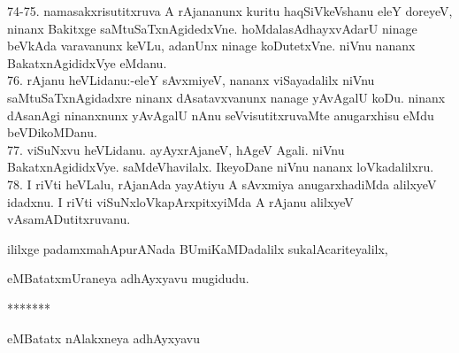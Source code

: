 \documentclass{article}
\begin{document}
74-75. namasakxrisutitxruva A rAjananunx kuritu haqSiVkeVshanu eleY doreyeV, ninanx Bakitxge saMtuSaTxnAgidedxVne. hoMdalasAdhayxvAdarU ninage beVkAda varavanunx keVLu, adanUnx ninage koDutetxVne. niVnu nananx BakatxnAgididxVye eMdanu.\\
76. rAjanu heVLidanu:-eleY sAvxmiyeV, nananx viSayadalilx niVnu saMtuSaTxnAgidadxre ninanx dAsatavxvanunx nanage yAvAgalU koDu. ninanx dAsanAgi ninanxnunx yAvAgalU nAnu seVvisutitxruvaMte anugarxhisu eMdu beVDikoMDanu.\\
77. viSuNxvu heVLidanu. ayAyxrAjaneV, hAgeV Agali. niVnu BakatxnAgididxVye. saMdeVhavilalx. IkeyoDane niVnu nananx loVkadalilxru.\\
78. I riVti heVLalu, rAjanAda yayAtiyu A sAvxmiya anugarxhadiMda alilxyeV idadxnu. I riVti viSuNxloVkapArxpitxyiMda A rAjanu alilxyeV vAsamADutitxruvanu.\\

\begin{center}
ililxge padamxmahApurANada BUmiKaMDadalilx sukalAcariteyalilx,
\end{center}

\begin{center}
eMBatatxmUraneya adhAyxyavu mugidudu.
\end{center}

\begin{center}
*******
\end{center}

\begin{center}
eMBatatx nAlakxneya adhAyxyavu
\end{center}
\end{document}
